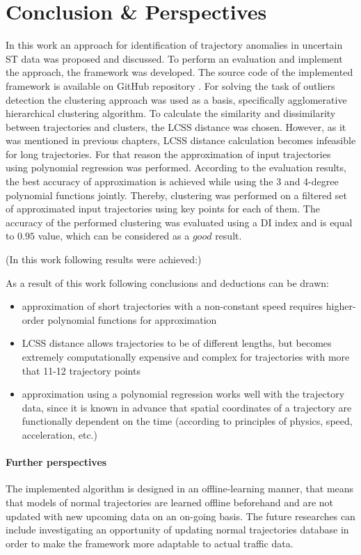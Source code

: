 \chapter{Conclusion \& Perspectives}
\label{ch:Conclusion & Perspectives}

In this work an approach for identification of trajectory anomalies in uncertain ST data was proposed and discussed. To perform an evaluation and implement the approach, the framework was developed. The source code of the implemented framework is available on GitHub repository \cite{online:mt_anomalies}. For solving the task of outliers detection the clustering approach was used as a basis, specifically agglomerative hierarchical clustering algorithm. To calculate the similarity and dissimilarity between trajectories and clusters, the LCSS distance was chosen. However, as it was mentioned in previous chapters, LCSS distance calculation becomes infeasible for long trajectories. For that reason the approximation of input trajectories using polynomial regression was performed. According to the evaluation results, the best accuracy of approximation is achieved while using the 3 and 4-degree polynomial functions jointly. Thereby, clustering was performed on a filtered set of approximated input trajectories using key points for each of them. The accuracy of the performed clustering was evaluated using a DI index and is equal to $0.95$ value, which can be considered as a $good$ result.

(In this work following results were achieved:)

As a result of this work following conclusions and deductions can be drawn:
\begin{itemize}
	\item approximation of short trajectories with a non-constant speed requires higher-order polynomial functions for approximation
	\item LCSS distance allows trajectories to be of different lengths, but becomes extremely computationally expensive and complex for trajectories with more that 11-12 trajectory points
	\item approximation using a polynomial regression works well with the trajectory data, since it is known in advance that spatial coordinates of a trajectory are functionally dependent on the time (according to principles of physics, speed, acceleration, etc.)
	
\end{itemize}

\bigbreak

\subsubsection{Further perspectives}
The implemented algorithm is designed in an offline-learning manner, that means that models of normal trajectories are learned offline beforehand and are not updated with new upcoming data on an on-going basis. The future researches can include investigating an opportunity of updating normal trajectories database in order to make the framework more adaptable to actual traffic data.
